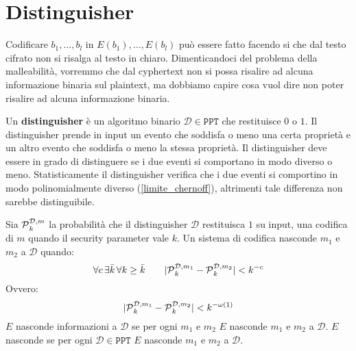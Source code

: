 \section{Distinguisher}\label{sec:distinguisher}
Codificare $b_1, \dots, b_l$ in $E(b_1), \dots, E(b_l)$ può essere fatto facendo si che dal testo cifrato non si risalga 
al testo in chiaro. Dimenticandoci del problema della malleabilità, vorremmo che dal cyphertext non si possa risalire
ad alcuna informazione binaria sul plaintext, ma dobbiamo capire cosa vuol dire non poter risalire ad alcuna informazione
binaria.
\begin{tcolorbox}[title = Distinguisher]
  Un \textbf{distinguisher} è un algoritmo binario $\mathcal{D} \in \texttt{PPT}$ che restituisce $0$ o $1$. Il distinguisher
  prende in input un evento che soddisfa o meno una certa proprietà e 
  un altro evento che soddisfa o meno la stessa proprietà. Il distinguisher deve essere in grado di distinguere
  se i due eventi si comportano in modo diverso o meno.
  Statisticamente il distinguisher verifica che i due eventi si comportino in modo polinomialmente diverso
  (\ref{limite_chernoff}), altrimenti tale differenza non sarebbe distinguibile.
\end{tcolorbox}
Sia $\text{$\mathcal{P}$}_k^{\mathcal{D}, m}$ la probabilità che il distinguisher $\mathcal{D}$ restituisca $1$ su input, una codifica 
di $m$ quando il security parameter vale $k$. Un sistema di codifica nasconde $m_1$ e $m_2$ a $\mathcal{D}$ quando:
\begin{equation}
  \forall c \, \exists \bar{k} \, \forall k \geq \bar{k} \qquad
  |\text{$\mathcal{P}$}_k^{\mathcal{D}, m_1} - \text{$\mathcal{P}$}_k^{\mathcal{D}, m_2}| < k^{-c}
\end{equation}
Ovvero:
\begin{equation}
  |\text{$\mathcal{P}$}_k^{\mathcal{D}, m_1} - \text{$\mathcal{P}$}_k^{\mathcal{D}, m_2}| < k^{-\omega(1)}
\end{equation}
$E$ nasconde informazioni a $\mathcal{D}$ se per ogni $m_1$ e $m_2$ $E$ nasconde $m_1$ e $m_2$ a $\mathcal{D}$. 
$E$ nasconde se per ogni $\mathcal{D} \in \texttt{PPT}$ $E$ nasconde $m_1$ e $m_2$ a $\mathcal{D}$.
